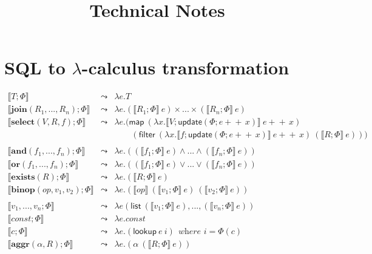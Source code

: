 \documentclass{article}
\newcommand{\concat}{\ensuremath{\!+\!\!\!\!+\!\,}}
\begin{document}
\title{Technical Notes}
\author{}
\date{}
\maketitle

\section*{SQL to $\lambda$-calculus transformation}


\[
\begin{array}{rcl}
 \llbracket T; \Phi  \rrbracket& \leadsto& \lambda e.T\\
\llbracket \mathbf{join}(R_1,...,R_n);\Phi \rrbracket &\leadsto& \lambda e.(\llbracket R_1; \Phi\rrbracket~e)\times...\times(\llbracket R_n;\Phi\rrbracket~e)\\
\llbracket \mathbf{select}(V, R, f);\Phi \rrbracket &\leadsto& \lambda e. (\mathsf{map}~(\lambda x.\llbracket V;\mathsf{update}(\Phi;e\concat x) \rrbracket~ e\concat x)\\
& & \qquad(\mathsf{filter}~(\lambda x.\llbracket f; \mathsf{update}(\Phi;e\concat x)\rrbracket~e\concat x)~ (\llbracket R;\Phi \rrbracket~e)))\\
\\
\llbracket \mathbf{and}(f_1,...,f_n);\Phi \rrbracket &\leadsto& \lambda e.((\llbracket f_1;\Phi \rrbracket~e) \land ... \land (\llbracket f_n;\Phi \rrbracket~e))\\
\llbracket \mathbf{or}(f_1,...,f_n);\Phi \rrbracket &\leadsto& \lambda e.((\llbracket f_1;\Phi \rrbracket~e) \lor ... \lor (\llbracket f_n;\Phi \rrbracket~e))\\
\llbracket\mathbf{exists}(R);\Phi \rrbracket &\leadsto& \lambda e. (\llbracket R;\Phi \rrbracket~e)\\
\llbracket \mathbf{binop}(\mathit{op}, v_1, v_2);\Phi\rrbracket &\leadsto&  \lambda e.(\llbracket \mathit{op} \rrbracket~(\llbracket v_1;\Phi \rrbracket~e)~(\llbracket v_2;\Phi \rrbracket~e))\\
\\
\llbracket v_1,...,v_n;\Phi \rrbracket & \leadsto &\lambda e(\mathsf{list}~(\llbracket v_1;\Phi\rrbracket~e),...,(\llbracket v_n;\Phi\rrbracket~e)) \\
\llbracket \mathit{const};\Phi \rrbracket & \leadsto & \lambda e.\mathit{const}\\
\llbracket \mathit{c};\Phi \rrbracket & \leadsto & \lambda e. (\mathsf{lookup}~e~i)~~\textit{where $i=\Phi(c)$}\\
\llbracket \mathbf{aggr}(\alpha, R);\Phi \rrbracket & \leadsto & \lambda e.(\alpha~(\llbracket R;\Phi\rrbracket~e))\\

\end{array}
\]

\end{document}
